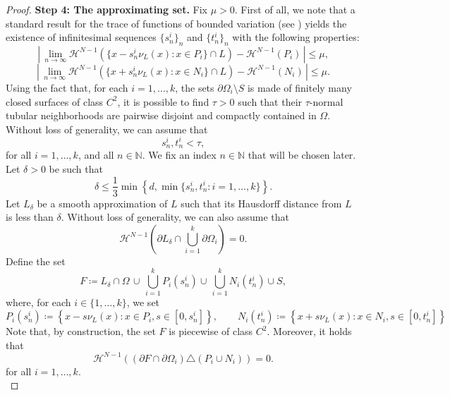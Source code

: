 \documentclass[a4paper, 11pt, reqno]{amsart}
\theoremstyle{plain}
\theoremstyle{definition}
\theoremstyle{remark}
\newcommand{\N}{\mathbb N}
\newcommand{\hno}{{\mathcal H}^{N-1}}
\begin{document}
\begin{proof}
\textbf{Step 4: The approximating set.}
Fix $\mu>0$.
First of all, we note that a standard result for the trace of functions of bounded variation (see \cite[Theorem 2.11]{Giusti}) yields the existence of infinitesimal sequences $\{s^i_n\}_n$ and $\{t^i_n\}_n$ with the following properties:
\begin{equation}\label{eq:hno_Pi}
\left|\, \lim_{n\to\infty} \hno\left( \{ x - s^i_n\nu_L(x) : x\in P_i \} \cap L \right) -  \hno(P_i) \,\right| \leq\mu,
\end{equation}
\begin{equation}\label{eq:hno_Ni}
\left|\, \lim_{n\to\infty} \hno\left( \{ x + s^i_n\nu_L(x) : x\in N_i \} \cap L \right) - \hno(N_i) \,\right| \leq\mu.
\end{equation}
Using the fact that, for each $i=1,\dots, k$, the sets $\partial\Omega_i\setminus S$ is made of finitely many closed surfaces of class $C^2$, it is possible to find $\tau>0$ such that their $\tau$-normal tubular neighborhoods are pairwise disjoint and compactly contained in $\Omega$.
Without loss of generality, we can assume that
\begin{equation}\label{eq:tau}
s_n^i, t_n^i < \tau,
\end{equation}
for all $i=1,\dots, k$, and all $n\in\N$.
We fix an index $n\in\N$ that will be chosen later.
Let $\delta>0$ be such that
\[
\delta \leq \frac{1}{3} \min\left\{ d,  \min\{ s^i_n, t^i_n : i=1,\dots,k \} \right\}.
\]
Let $L_\delta$ be a smooth approximation of $L$ such that its Hausdorff distance from $L$ is less than $\delta$.
Without loss of generality, we can also assume that
\[
\hno\left(\partial L_\delta \cap \bigcup_{i=1}^k \partial\Omega_i\right) = 0.
\]
Define the set
\[
F \coloneqq L_\delta\cap\Omega \, \cup \,
    \bigcup_{i=1}^k P_i(s^i_n)
    \cup \,
    \bigcup_{i=1}^k N_i(t^i_n)
    \cup S,
\]
where, for each $i\in\{1,\dots,k\}$, we set
\[
P_i(s^i_n)\coloneqq \left\{ x - s\nu_L(x) : x\in P_i, s\in[0, s^i_n]  \right\},\quad\quad
N_i(t^i_n)\coloneqq \left\{ x + s\nu_L(x) : x\in N_i, s\in[0, t^i_n]  \right\}
\]
Note that, by construction, the set $F$ is piecewise of class $C^2$.
Moreover, it holds that
\begin{equation}\label{eq:boundary_F}
\hno\left( (\partial F\cap \partial\Omega_i) \triangle (P_i\cup N_i) \right)=0.
\end{equation}
for all $i=1,\dots,k$.\\


\end{proof}
\end{document}
